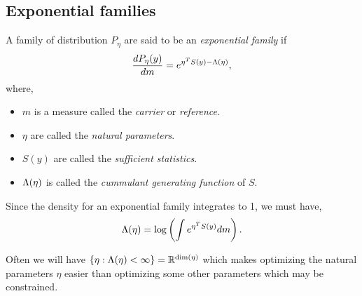 \subsection{Exponential families}
A family of distribution $P_\eta$ are said to be an \emph{exponential family} if 
\[\frac{dP_\eta(y)}{dm} = e^{\eta^T S(y) - \Lambda(\eta)}, \]
where,
\begin{itemize}
    \item $m$ is a measure called the \emph{carrier} or \emph{reference}.
    \item $\eta$ are called the \emph{natural parameters}.
    \item $S(y)$ are called the \emph{sufficient statistics}.
    \item $\Lambda(\eta)$ is called the \emph{cummulant generating function} of $S$.
\end{itemize}
Since the density for an exponential family integrates to 1, we must have,
\[\Lambda(\eta) = \log\left(\int e^{\eta^T S(y)}dm\right). \]
\begin{remark}
    Often we will have $\{\eta : \Lambda(\eta) < \infty\} = {\mathbb R}^{\dim(\eta)}$ which makes optimizing the natural parameters $\eta$ easier than optimizing some other parameters which may be constrained.
\end{remark}
